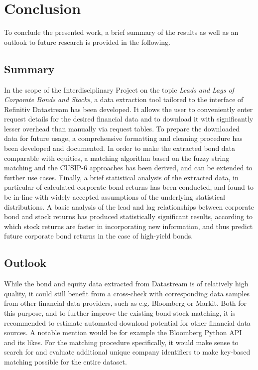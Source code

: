 \chapter{Conclusion} \label{chapter:Conclusion}
To conclude the presented work, a brief summary of the results as well as an outlook to future research is provided in the following. 

\section{Summary}
In the scope of the Interdisciplinary Project on the topic \textit{Leads and Lags of Corporate Bonds and Stocks}, a data extraction tool tailored to the interface of Refinitiv Datastream has been developed. It allows the user to conveniently enter request details for the desired financial data and to download it with significantly lesser overhead than manually via request tables. To prepare the downloaded data for future usage, a comprehensive formatting and cleaning procedure has been developed and documented. In order to make the extracted bond data comparable with equities, a matching algorithm based on the fuzzy string matching and the CUSIP-6 approaches has been derived, and can be extended to further use cases. Finally, a brief statistical analysis of the extracted data, in particular of calculated corporate bond returns has been conducted, and found to be in-line with widely accepted assumptions of the underlying statistical distributions. A basic analysis of the lead and lag relationships between corporate bond and stock returns has produced statistically significant results, according to which stock returns are faster in incorporating new information, and thus predict future corporate bond returns in the case of high-yield bonds. 

\section{Outlook}
While the bond and equity data extracted from Datastream is of relatively high quality, it could still benefit from a cross-check with corresponding data samples from other financial data providers, such as e.g. Bloomberg or Markit. Both for this purpose, and to further improve the existing bond-stock matching, it is recommended to estimate automated download potential for other financial data sources. A notable mention would be for example the Bloomberg Python API and its likes. For the matching procedure specifically, it would make sense to search for and evaluate additional unique company identifiers to make key-based matching possible for the entire dataset. 

